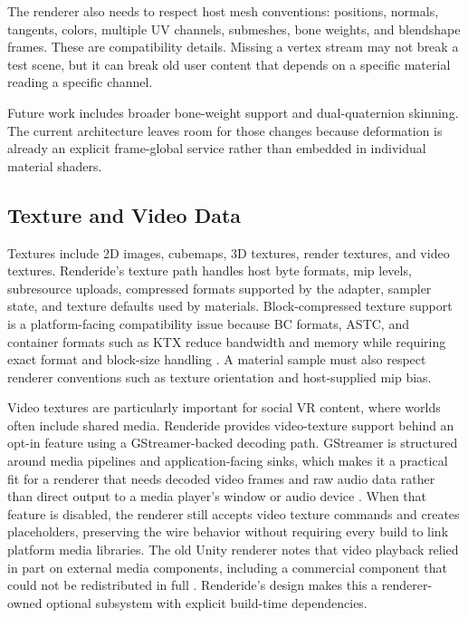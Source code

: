 \documentclass[acmtog,screen,nonacm]{acmart}
\begin{document}
The renderer also needs to respect host mesh conventions: positions, normals, tangents, colors, multiple UV channels, submeshes, bone weights, and blendshape frames. These are compatibility details. Missing a vertex stream may not break a test scene, but it can break old user content that depends on a specific material reading a specific channel.

Future work includes broader bone-weight support and dual-quaternion skinning. The current architecture leaves room for those changes because deformation is already an explicit frame-global service rather than embedded in individual material shaders.

\subsection{Texture and Video Data}

Textures include 2D images, cubemaps, 3D textures, render textures, and video textures. Renderide's texture path handles host byte formats, mip levels, subresource uploads, compressed formats supported by the adapter, sampler state, and texture defaults used by materials. Block-compressed texture support is a platform-facing compatibility issue because BC formats, ASTC, and container formats such as KTX reduce bandwidth and memory while requiring exact format and block-size handling \citep{microsoftBlockCompression,astcKhronos,ktxSpec}. A material sample must also respect renderer conventions such as texture orientation and host-supplied mip bias.

Video textures are particularly important for social VR content, where worlds often include shared media. Renderide provides video-texture support behind an opt-in feature using a GStreamer-backed decoding path. GStreamer is structured around media pipelines and application-facing sinks, which makes it a practical fit for a renderer that needs decoded video frames and raw audio data rather than direct output to a media player's window or audio device \citep{gstreamerAppManual,gstreamerAppsink}. When that feature is disabled, the renderer still accepts video texture commands and creates placeholders, preserving the wire behavior without requiring every build to link platform media libraries. The old Unity renderer notes that video playback relied in part on external media components, including a commercial component that could not be redistributed in full \citep{unityRendererRepo}. Renderide's design makes this a renderer-owned optional subsystem with explicit build-time dependencies.
\end{document}
